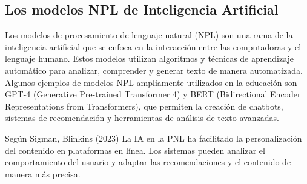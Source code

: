 \documentclass{article}
\newenvironment{marcoTeorico}{}{}
\begin{document}
\begin{marcoTeorico}
  \subsection{Los modelos NPL de Inteligencia Artificial}

  Los modelos de procesamiento de lenguaje natural (NPL) son una rama de la inteligencia artificial que se enfoca en la interacción entre las computadoras y el lenguaje humano. Estos modelos utilizan algoritmos y técnicas de aprendizaje automático para analizar, comprender y generar texto de manera automatizada. Algunos ejemplos de modelos NPL ampliamente utilizados en la educación son GPT-4 (Generative Pre-trained Transformer 4) y BERT (Bidirectional Encoder Representations from Transformers), que permiten la creación de chatbots, sistemas de recomendación y herramientas de análisis de texto avanzadas.

  Según Sigman, Blinkins (2023) La  IA  en  la  PNL  ha  facilitado  la  personalización  del  contenido  en  plataformas  en línea.   Los   sistemas   pueden   analizar   el   comportamiento   del   usuario   y   adaptar   las recomendaciones y el contenido de manera más precisa.
\end{marcoTeorico}

\newpage
\end{document}
